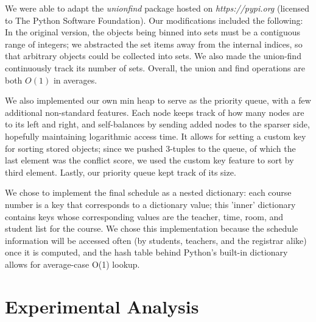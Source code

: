 \documentclass[11pt, oneside]{article}   	%
\begin{document}
We were able to adapt the {\it unionfind} package hosted on {\it https://pypi.org} (licensed to The Python Software Foundation). Our modifications included the following: In the original version, the objects being binned into sets must be a contiguous range of integers; we abstracted the set items away from the internal indices, so that arbitrary objects could be collected into sets. We also made the union-find continuously track its number of sets. Overall, the union and find operations are both $O(1)$ in averages.

We also implemented our own min heap to serve as the priority queue, with a few additional non-standard features. Each node keeps track of how many nodes are to its left and right, and self-balances by sending added nodes to the sparser side, hopefully maintaining logarithmic access time. It allows for setting a custom key for sorting stored objects; since we pushed 3-tuples to the queue, of which the last element was the conflict score, we used the custom key feature to sort by third element. Lastly, our priority queue kept track of its size.

We chose to implement the final schedule as a nested dictionary: each course number is a key that corresponds to a dictionary value; this 'inner' dictionary contains keys whose corresponding values are the teacher, time, room, and student list for the course. We chose this implementation because the schedule information will be accessed often (by students, teachers, and the registrar alike) once it is computed, and the hash table behind Python's built-in dictionary allows for average-case O(1) lookup.

\section{Experimental Analysis}
\end{document}
